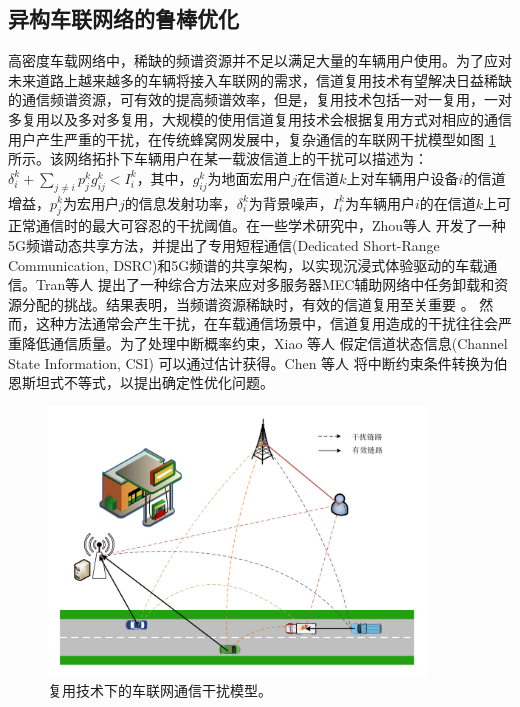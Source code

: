 \subsection{异构车联网络的鲁棒优化} \label{section1-2-1}

高密度车载网络中，稀缺的频谱资源并不足以满足大量的车辆用户使用。为了应对未来道路上越来越多的车辆将接入车联网的需求，信道复用技术有望解决日益稀缺的通信频谱资源，可有效的提高频谱效率，但是，复用技术包括一对一复用，一对多复用以及多对多复用，大规模的使用信道复用技术会根据复用方式对相应的通信用户产生严重的干扰，在传统蜂窝网发展中，复杂通信的车联网干扰模型如图 \ref{复用技术下的通信干扰模型} 所示。该网络拓扑下车辆用户在某一载波信道上的干扰可以描述为：$\delta _{i}^{k}+\sum\limits_{j\ne i}{p_{j}^{k}g_{ij}^{k}}<I_{i}^{k}$，其中，$g_{ij}^{k}$为地面宏用户$j$在信道$k$上对车辆用户设备$i$的信道增益，$p_{j}^{k}$为宏用户$j$的信息发射功率，$\delta _{i}^{k}$为背景噪声，$I_{i}^{k}$为车辆用户$i$的在信道$k$上可正常通信时的最大可容忍的干扰阈值。在一些学术研究中，Zhou等人  \supercite{Zhou2017} 开发了一种5G频谱动态共享方法，并提出了专用短程通信(Dedicated Short-Range Communication, DSRC)和5G频谱的共享架构，以实现沉浸式体验驱动的车载通信。Tran等人  \supercite{Tran2019}  提出了一种综合方法来应对多服务器MEC辅助网络中任务卸载和资源分配的挑战。结果表明，当频谱资源稀缺时，有效的信道复用至关重要 \supercite{Liang2021}。 然而，这种方法通常会产生干扰，在车载通信场景中，信道复用造成的干扰往往会严重降低通信质量。为了处理中断概率约束，Xiao 等人 \supercite{Xiao2020} 假定信道状态信息(Channel State Information, CSI) 可以通过估计获得。Chen 等人 \supercite{Chen2022} 将中断约束条件转换为伯恩斯坦式不等式，以提出确定性优化问题。
\begin{figure}[H]
\centering
\includegraphics[width=10cm]{figures//chap1//车联网的干扰模型.pdf}
\caption{复用技术下的车联网通信干扰模型。}
\label{复用技术下的通信干扰模型}
\end{figure}

